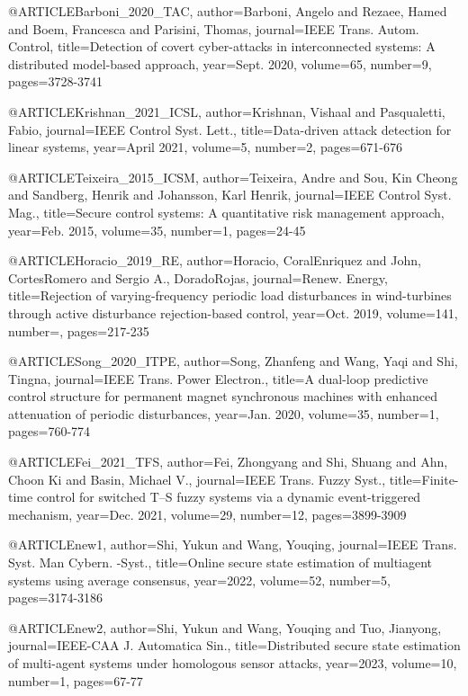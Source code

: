@ARTICLE{Barboni_2020_TAC,
  author={Barboni, Angelo and Rezaee, Hamed and Boem, Francesca and Parisini, Thomas},
  journal={IEEE Trans. Autom. Control}, 
  title={Detection of covert cyber-attacks in interconnected systems: A distributed model-based approach}, 
  year={Sept. 2020},
  volume={65},
  number={9},
  pages={3728-3741}}

@ARTICLE{Krishnan_2021_ICSL,
  author={Krishnan, Vishaal and Pasqualetti, Fabio},
  journal={IEEE Control Syst. Lett.}, 
  title={Data-driven attack detection for linear systems}, 
  year={April 2021},
  volume={5},
  number={2},
  pages={671-676}}

@ARTICLE{Teixeira_2015_ICSM,
  author={Teixeira, Andre and Sou, Kin Cheong and Sandberg, Henrik and Johansson, Karl Henrik},
  journal={IEEE Control Syst. Mag.}, 
  title={Secure control systems: A quantitative risk management approach}, 
  year={Feb. 2015},
  volume={35},
  number={1},
  pages={24-45}}

@ARTICLE{Horacio_2019_RE,
  author={Horacio, CoralEnriquez and John, CortesRomero and Sergio A., DoradoRojas},
  journal={Renew. Energy}, 
  title={Rejection of varying-frequency periodic load disturbances in wind-turbines through active disturbance rejection-based control}, 
  year={Oct. 2019},
  volume={141},
  number={},
  pages={217-235}}

@ARTICLE{Song_2020_ITPE,
  author={Song, Zhanfeng and Wang, Yaqi and Shi, Tingna},
  journal={IEEE Trans. Power Electron.}, 
  title={A dual-loop predictive control structure for permanent magnet synchronous machines with enhanced attenuation
 of periodic disturbances}, 
  year={Jan. 2020},
  volume={35},
  number={1},
  pages={760-774}}

@ARTICLE{Fei_2021_TFS,
  author={Fei, Zhongyang and Shi, Shuang and Ahn, Choon Ki and Basin, Michael V.},
  journal={IEEE Trans. Fuzzy Syst.}, 
  title={Finite-time control for switched T–S fuzzy systems via a dynamic event-triggered mechanism}, 
  year={Dec. 2021},
  volume={29},
  number={12},
  pages={3899-3909}}

@ARTICLE{new1,
  author={Shi, Yukun and Wang, Youqing},
  journal={IEEE Trans. Syst. Man Cybern. -Syst.}, 
  title={Online secure state estimation of multiagent systems using average consensus}, 
  year={2022},
  volume={52},
  number={5},
  pages={3174-3186}}

@ARTICLE{new2,
  author={Shi, Yukun and Wang, Youqing and Tuo, Jianyong},
  journal={IEEE-CAA J. Automatica Sin.}, 
  title={Distributed secure state estimation of multi-agent systems under homologous sensor attacks}, 
  year={2023},
  volume={10},
  number={1},
  pages={67-77}}


